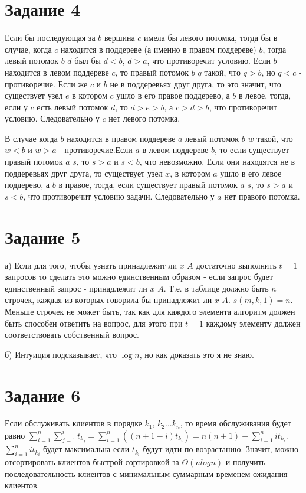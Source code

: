 \documentclass[a4paper,12pt]{article}
\begin{document}
\section*{Задание 4}
\hspace{0.5cm}
Если бы последующая за $b$ вершина $c$ имела бы левого потомка, тогда бы в случае, когда $c$ находится в поддереве (а именно в правом поддереве) $b$, тогда левый потомок $b$ $d$ был бы $d<b$, $d>a$, что противоречит условию. Если $b$ находится в левом поддереве $c$, то правый потомок $b$ $q$ такой, что $q>b$, но $q<c$ - противоречие. Если же $c$ и $b$ не в поддеревьях друг друга, то это значит, что существует узел $e$ в котором $c$ ушло в его правое поддерево, а $b$ в левое, тогда, если у $c$ есть левый потомок $d$, то $d>e>b$, а $c>d>b$, что противоречит условию. Следовательно у $c$ нет левого потомка.

В случае когда $b$ находится в правом поддереве $a$ левый потомок $b$ $w$ такой, что $w<b$ и $w>a$ - противоречие.Если $a$ в левом поддереве $b$, то если существует правый потомок $a$ $s$, то $s>a$ и $s<b$, что невозможно. Если они находятся не в поддеревьях друг друга, то существует узел $x$, в котором $a$ ушло в его левое поддерево, а $b$ в правое, тогда, если существует правый потомок $a$ $s$, то $s>a$ и $s<b$, что противоречит условию задачи.
Следовательно у $a$ нет правого потомка.


\section*{Задание 5}
\hspace{0.5cm}
а) Если для того, чтобы узнать принадлежит ли $x$ $A$ достаточно выполнить $t=1$ запросов то сделать это можно единственным образом - если запрос будет единственный запрос - принадлежит ли $x$ $A$. Т.е. в таблице должно быть $n$ строчек, каждая из которых говорила бы принадлежит ли $x$ $A$. $s(m,k,1)=n$. Меньше строчек не может быть, так как для каждого элемента алгоритм должен быть способен ответить на вопрос, для этого при $t=1$ каждому элементу должен соответствовать собственный вопрос.

б) Интуиция подсказывает, что $\log{n}$, но как доказать это я не знаю.

\section*{Задание 6}
\hspace{0.5cm}
Если обслуживать клиентов в порядке $k_{1}$, $k_{2}$...$k_{n}$, то время обслуживания будет равно $\sum\limits_{i=1}^{n}\sum\limits_{j=1}^{i}t_{k_{j}}=\sum\limits_{i=1}^{n}\left( (n+1-i)t_{k_{i}}\right) =n(n+1)-\sum\limits_{i=1}^{n}i t_{k_{i}}$. $\sum\limits_{i=1}^{n}i t_{k_{i}}$ будет максимальна если $t_{k_{i}}$ будут идти по возрастанию. Значит, можно отсортировать клиентов быстрой сортировкой за $\Theta(nlog{n})$ и получить последовательность клиентов с минимальным суммарным временем  ожидания клиентов.
\end{document}
